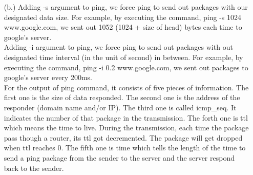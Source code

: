 \documentclass[12pt]{article}
\begin{document}
\begin{singlespace}
\begin{enumerate}
\begin{itemize}
	\item[(b.)] Adding -s argument to ping, we force ping to send out packages with our designated data size. For example, by executing the command, ping -s 1024 www.google.com, we sent out 1052 (1024 + size of head) bytes each time to google's server.\\
	Adding -i argument to ping, we force ping to send out packages with out designated time interval (in the unit of second) in between. For example, by executing the command, ping -i 0.2 www.google.com, we sent out packages to google's server every 200ms.\\
	For the output of ping command, it consists of five pieces of information. The first one is the size of data responded. The second one is the address of the responder (domain name and/or IP). The third one is called icmp\_seq. It indicates the number of that package in the transmission. The forth one is ttl which means the time to live. During the transmission, each time the package pass though a router, its ttl got decremented. The package will get dropped when ttl reaches 0. The fifth one is time which tells the length of the time to send a ping package from the sender to the server and the server respond back to the sender.
	\end{itemize}
\end{enumerate}
\end{singlespace}

\clearpage

\printbibliography
\end{document}
